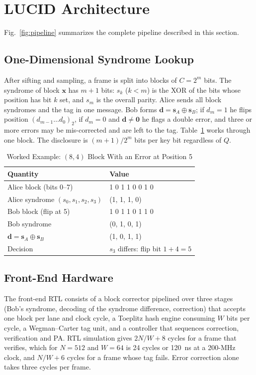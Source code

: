 \documentclass[conference]{IEEEtran}
\begin{document}
\section{LUCID Architecture}\label{sec:arch}

Fig.~\ref{fig:pipeline} summarizes the complete pipeline described in this section.

\subsection{One-Dimensional Syndrome Lookup}
After sifting and sampling, a frame is split into blocks of $C=2^{m}$ bits. The syndrome of block $\mathbf{x}$ has $m+1$ bits: $s_k$ ($k<m$) is the XOR of the bits whose position has bit $k$ set, and $s_m$ is the overall parity. Alice sends all block syndromes and the tag in one message. Bob forms $\mathbf{d}=\mathbf{s}_A\oplus\mathbf{s}_B$; if $d_m=1$ he flips position $(d_{m-1}\ldots d_0)_2$, if $d_m=0$ and $\mathbf{d}\neq\mathbf{0}$ he flags a double error, and three or more errors may be mis-corrected and are left to the tag. Table~\ref{tab:example} works through one block. The disclosure is $(m+1)/2^m$ bits per key bit regardless of $Q$.

\begin{table}[t]
\caption{Worked Example: $(8,4)$ Block With an Error at Position 5}
\label{tab:example}
\centering
\begin{tabular}{@{}ll@{}}
\toprule
Quantity & Value\\
\midrule
Alice block (bits 0--7) & 1 0 1 1 0 0 1 0\\
Alice syndrome $(s_0,s_1,s_2,s_3)$ & (1, 1, 1, 0)\\
Bob block (flip at 5) & 1 0 1 1 0 1 1 0\\
Bob syndrome & (0, 1, 0, 1)\\
$\mathbf{d}=\mathbf{s}_A\oplus\mathbf{s}_B$ & (1, 0, 1, 1)\\
Decision & $s_3$ differs: flip bit $1+4=5$\\
\bottomrule
\end{tabular}
\end{table}

\subsection{Front-End Hardware}
The front-end RTL consists of a block corrector pipelined over three stages (Bob's syndrome, decoding of the syndrome difference, correction) that accepts one block per lane and clock cycle, a Toeplitz hash engine consuming $W$ bits per cycle, a Wegman--Carter tag unit, and a controller that sequences correction, verification and PA. RTL simulation gives $2N/W+8$ cycles for a frame that verifies, which for $N=512$ and $W=64$ is 24 cycles or 120~ns at a 200-MHz clock, and $N/W+6$ cycles for a frame whose tag fails. Error correction alone takes three cycles per frame.
\end{document}
